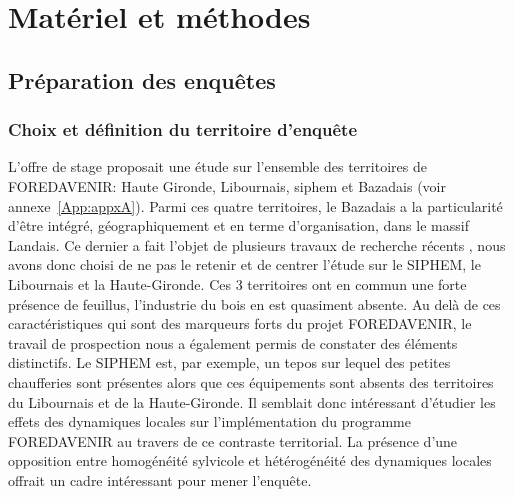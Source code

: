 \documentclass[12pt]{report}
\newcommand\indexp[1]{#1\index{#1}}
\begin{document}


\chapter{Matériel et méthodes}\label{sec:M&M}

\section{Préparation des enquêtes}

\subsection{Choix et définition du territoire d'enquête}

L'offre de stage proposait une étude sur l'ensemble des territoires de
\indexp{FOREDAVENIR}: Haute Gironde, Libournais, \gls{siphem} et Bazadais (voir annexe~\ref{App:appxA}).
Parmi ces quatre territoires, le Bazadais a la particularité d'être intégré,
géographiquement et en terme d'organisation, dans le massif Landais. Ce dernier
a fait l’objet de plusieurs travaux de recherche récents
\citep{BEbanosDehez_ref78,brahic2017_ref114,dehez2017_ref115}, nous avons donc
choisi de ne pas le retenir et de centrer l'étude sur le SIPHEM, le
Libournais et la Haute-Gironde. Ces 3 territoires ont en commun une forte
présence de feuillus, l'industrie du bois en est quasiment absente. Au
delà de ces caractéristiques qui sont des marqueurs forts
du projet FOREDAVENIR, le travail de
prospection nous a également permis de constater des éléments
distinctifs. Le SIPHEM est, par exemple, un \gls{tepos} sur lequel des petites chaufferies sont présentes
\citep{BEbanosDehez_ref78} alors que ces équipements sont absents des
territoires du Libournais et de la Haute-Gironde. Il semblait donc intéressant
d'étudier les effets des dynamiques locales sur l'implémentation du
programme FOREDAVENIR au travers de ce contraste territorial. La présence d'une
opposition entre homogénéité sylvicole et hétérogénéité des dynamiques locales
offrait un cadre intéressant pour mener l'enquête.
\end{document}
